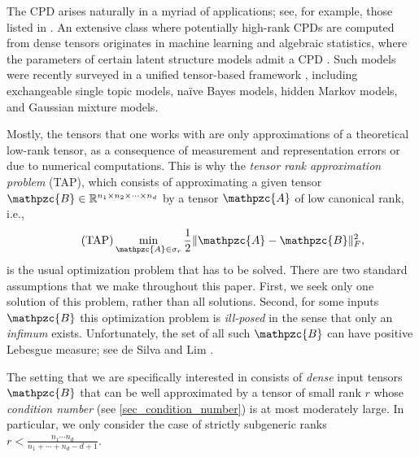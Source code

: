 \documentclass[a4paper,10pt,final]{siamart1116}
\newcommand{\tensor}[1]{\mathpzc{#1}}
\newcommand{\R}{\mathbb{R}}
\newcommand{\refsec}[1]{{\cref{#1}}}
\numberwithin{equation}{section}
\numberwithin{figure}{section}
\numberwithin{table}{section}
\numberwithin{theorem}{section}
\begin{document}
The CPD arises naturally in a myriad of applications; see, for example, those listed in \cite{Review2017}.
An extensive class where potentially high-rank CPDs are computed from dense tensors originates in machine learning and algebraic statistics, where the parameters of certain latent structure models admit a CPD \cite{GSS2005,SH2005,AMR2009,AGHKT2014}. Such models were recently surveyed in a unified tensor-based framework \cite{AGHKT2014}, including exchangeable single topic models, na\"ive Bayes models, hidden Markov models, and Gaussian mixture models.

Mostly, the tensors that one works with are only approximations of a theoretical low-rank tensor, as a consequence of measurement and representation errors or due to numerical computations. This is why the \emph{tensor rank approximation problem} (TAP), which consists of approximating a given tensor $\tensor{B} \in \R^{n_1 \times n_2 \times \cdots \times n_d}$ by a tensor $\tensor{A}$ of low canonical rank, i.e.,
\begin{equation}\tag{TAP}\label{TAP}
  \min_{\tensor{A} \in \sigma_r} \frac{1}{2} \| \tensor{A} - \tensor{B} \|^2_F,
\end{equation}
is the usual optimization problem that has to be solved. There are two standard assumptions that we make throughout this paper. First, we seek only one solution of this problem, rather than all solutions. Second, for some inputs $\tensor{B}$ this optimization problem is \textit{ill-posed} in the sense that only an \emph{infimum} exists. Unfortunately, the set of all such $\tensor{B}$ can have positive Lebesgue measure; see de Silva and Lim \cite{dSL2008}.


The setting that we are specifically interested in consists of \emph{dense} input tensors $\tensor{B}$ that can be well approximated by a tensor of small rank $r$ whose \emph{condition number} \cite{BV2017} (see \refsec{sec_condition_number}) is at most moderately large. In particular, we only consider the case of strictly subgeneric ranks $r < \frac{n_1 \cdots n_d}{n_1+\cdots+n_d-d+1}$.
\end{document}
